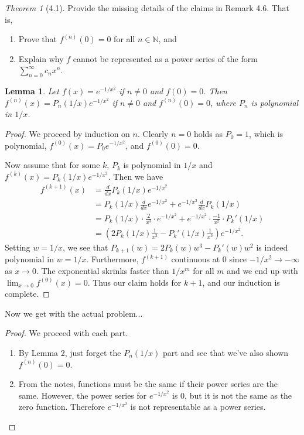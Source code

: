 \documentclass[12pt]{article}
\newtheorem{lemma}{Lemma}
\theoremstyle{remark}
\theoremstyle{named}
\newtheorem*{theorem}{Theorem}
\begin{document}
\newpage

\begin{theorem}[4.1]
    Provide the missing details of the claims in Remark 4.6. That is,
    \begin{enumerate}
        \item Prove that \(f^{(n)}(0) = 0\) for all \( n \in \mathbb N\), and
        \item Explain why \(f\) cannot be represented as a power series of the form \(\sum_{n = 0}^\infty c_n x^n\).
    \end{enumerate}
\end{theorem}

\begin{lemma}
    Let \(f(x) = e^{-1/x^2}\) if \(n \neq 0\) and \(f(0) = 0\). Then \(f^{(n)}(x) = P_n(1/x) e^{-1/x^2}\) if \(n \neq 0\) and \(f^{(n)}(0) = 0\), where \(P_n\) is polynomial in \(1/x\).
\end{lemma}

\begin{proof}
    We proceed by induction on \(n\). Clearly \(n = 0\) holds as \(P_0 = 1\), which is polynomial, \(f^{(0)}(x) = P_0 e^{-1/x^2}\), and \(f^{(0)}(0) = 0\).

    Now assume that for some \(k\), \(P_k\) is polynomial in \(1/x\) and \(f^{(k)}(x) = P_k(1/x) e^{-1/x^2}\). Then we have
    \begin{align*}
        f^{(k + 1)}(x) &= \frac{d}{dx} P_k(1/x) e^{-1/x^2} \\
        &= P_k(1/x) \frac{d}{dx} e^{-1/x^2} + e^{-1/x^2} \frac{d}{dx} P_k(1/x) \\
        &= P_k(1/x) \cdot \frac{2}{x^3} \cdot e^{-1/x^2} + e^{-1/x^2} \cdot \frac{-1}{x^2} \cdot P_k'(1/x) \\
        &= \left(2 P_k(1/x) \frac{1}{x^3} - P_k'(1/x) \frac{1}{x^2}\right) e^{-1/x^2}.
    \end{align*}
    Setting \(w = 1/x\), we see that \(P_{k + 1}(w) = 2 P_k(w) w^3 - P_k'(w) w^2\) is indeed polynomial in \(w = 1/x\). Furthermore, \(f^{(k + 1)}\) continuous at 0 since \(-1/x^2 \to -\infty\) as \(x \to 0\). The exponential skrinks faster than \(1/x^m\) for all \(m\) and we end up with \(\lim_{x \to 0} f^{(0)}(x) = 0\). Thus our claim holds for \(k + 1\), and our induction is complete.
\end{proof}

Now we get with the actual problem...

\begin{proof}
    We proceed with each part.
    \begin{enumerate}
        \item By Lemma 2, just forget the \(P_n(1/x)\) part and see that we've also shown \(f^{(n)}(0) = 0\).
        \item From the notes, functions must be the same if their power series are the same. However, the power series for \(e^{-1/x^2}\) is 0, but it is not the same as the zero function. Therefore \(e^{-1/x^2}\) is not representable as a power series.
    \end{enumerate}
\end{proof}
\end{document}
